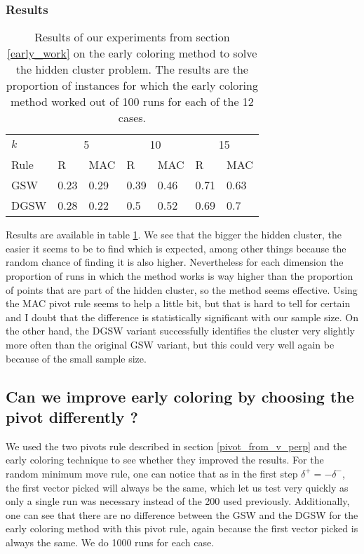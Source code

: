 \documentclass[12pt]{article}
\begin{document}
\subsubsection{Results}
\begin{table}[h!]
\centering
\caption{Results of our experiments from section \ref{early_work} on the early coloring method to solve the hidden cluster problem. The results are the proportion of instances for which the early coloring method worked out of 100 runs for each of the 12 cases.}
\begin{tabular}{l|ll|ll|ll}
$k$  & \multicolumn{2}{c}{5} & \multicolumn{2}{c}{10} & \multicolumn{2}{c}{15}\\
Rule &R&MAC&R&MAC&R&MAC\\ \hline
GSW  &0.23&0.29&0.39&0.46&0.71&0.63\\
DGSW &0.28&0.22&0.5&0.52&0.69&0.7\\
\end{tabular}
\label{early_coloring_method_exp1}
\end{table}
Results are available in table \ref{early_coloring_method_exp1}. We see that the bigger the hidden cluster, the easier it seems to be to find which is expected, among other things because the random chance of finding it is also higher. Nevertheless for each dimension the proportion of runs in which the method works is way higher than the proportion of points that are part of the hidden cluster, so the method seems effective. Using the MAC pivot rule seems to help a little bit, but that is hard to tell for certain and I doubt that the difference is statistically significant with our sample size. On the other hand, the DGSW variant successfully identifies the cluster very slightly more often than the original GSW variant, but this could very well again be because of the small sample size.

\subsection{Can we improve early coloring by choosing the pivot differently ?}\label{new_rule_tests}
We used the two pivots rule described in section \ref{pivot_from_v_perp} and the early coloring technique to see whether they improved the results. For the random minimum move rule, one can notice that as in the first step $\delta^+=-\delta^-$, the first vector picked will always be the same, which let us test very quickly as only a single run was necessary instead of the 200 used previously. Additionally, one can see that there are no difference between the GSW and the DGSW for the early coloring method with this pivot rule, again because the first vector picked is always the same. We do 1000 runs for each case.
\end{document}
